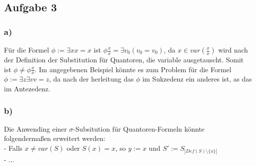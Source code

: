 \documentclass[12pt]{article}
\begin{document}
\subsection*{Aufgabe 3}
\subsubsection*{a)}
Für die Formel $\phi:=\exists x x=x$ ist $\phi \frac{x}{x} = \exists v_0 (v_0 = v_0)$,
da $x\in var(\frac{x}{x})$ wird nach der Definition der Substitution für Quantoren,
die variable ausgetauscht. Somit ist $\phi \neq\phi\frac{x}{x}$.
Im angegebenen Beispiel könnte es zum Problem für die Formel $\phi := \exists z \exists v v = z$, da nach der herleitung das $\phi$ im Sukzedenz ein anderes ist, as das im Antezedenz.

\subsubsection*{b)}
Die Anwending einer $\sigma$-Subsitution für Quantoren-Formeln könnte folgendermaßen erweitert werden:\\
- Falls $x\neq var(S)$ oder $S(x) = x$, so $y := x$ und $S':=S_{|Def(S)\setminus \{x\}|}$ \\
- ...
\end{document}

